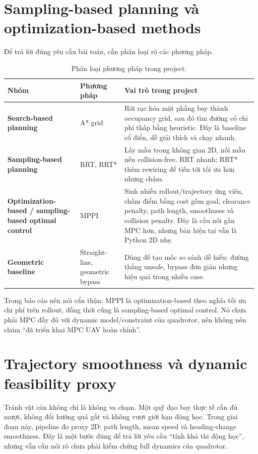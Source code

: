 \documentclass[10pt,a4paper]{article}
\begin{document}
\section{Sampling-based planning và optimization-based methods}

Để trả lời đúng yêu cầu bài toán, cần phân loại rõ các phương pháp.

\begin{table}[H]
\centering
\small
\caption{Phân loại phương pháp trong project.}
\begin{tabularx}{0.96\linewidth}{>{\bfseries}p{3.2cm} p{3.2cm} X}
\toprule
Nhóm & Phương pháp & Vai trò trong project \\
\midrule
Search-based planning & A* grid & Rời rạc hóa mặt phẳng bay thành occupancy grid, sau đó tìm đường có chi phí thấp bằng heuristic. Đây là baseline cổ điển, dễ giải thích và chạy nhanh. \\
Sampling-based planning & RRT, RRT* & Lấy mẫu trong không gian 2D, nối mẫu nếu collision-free. RRT nhanh; RRT* thêm rewiring để tiến tới tối ưu hơn nhưng chậm. \\
Optimization-based / sampling-based optimal control & MPPI & Sinh nhiều rollout/trajectory ứng viên, chấm điểm bằng cost gồm goal, clearance penalty, path length, smoothness và collision penalty. Đây là cầu nối gần MPC hơn, nhưng bản hiện tại vẫn là Python 2D nhẹ. \\
Geometric baseline & Straight-line, geometric bypass & Dùng để tạo mốc so sánh dễ hiểu: đường thẳng unsafe, bypass đơn giản nhưng hiệu quả trong nhiều case. \\
\bottomrule
\end{tabularx}
\end{table}

Trong báo cáo nên nói cẩn thận: MPPI là optimization-based theo nghĩa tối ưu chi phí trên rollout, đồng thời cũng là sampling-based optimal control. Nó chưa phải MPC đầy đủ với dynamic model/constraint của quadrotor, nên không nên claim ``đã triển khai MPC UAV hoàn chỉnh''.

\section{Trajectory smoothness và dynamic feasibility proxy}

Tránh vật cản không chỉ là không va chạm. Một quỹ đạo bay thực tế cần đủ mượt, không đổi hướng quá gắt và không vượt giới hạn động học. Trong giai đoạn này, pipeline đo proxy 2D: path length, mean speed và heading-change smoothness. Đây là một bước đúng để trả lời yêu cầu ``tính khả thi động học'', nhưng vẫn cần nói rõ chưa phải kiểm chứng full dynamics của quadrotor.
\end{document}
